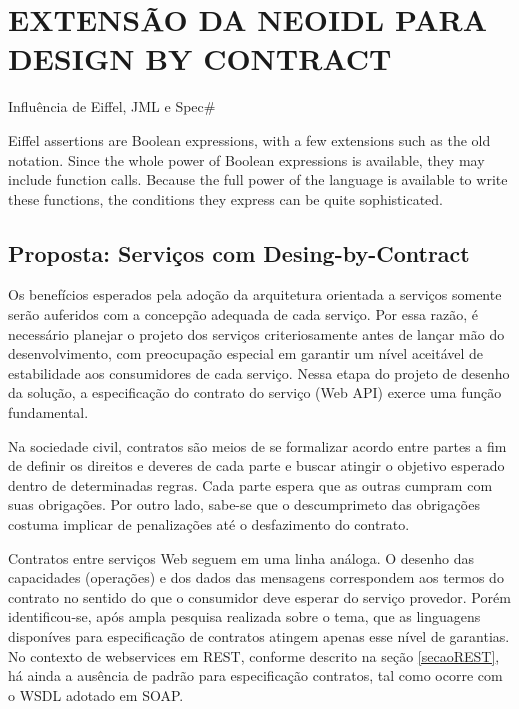 
\section{EXTENSÃO DA NEOIDL PARA DESIGN BY CONTRACT}

Influência de Eiffel, JML e Spec\#

Eiffel assertions are Boolean expressions, with a few extensions such as the old
notation. Since the whole power of Boolean expressions is available, they may
include function calls. Because the full power of the language is available to
write these functions, the conditions they express can be quite sophisticated.
\cite{meyer1992applying}

 
 
\subsection{Proposta: Serviços com Desing-by-Contract}
\vspace{-6mm}

Os benefícios esperados pela adoção da arquitetura orientada a serviços
somente serão auferidos com a concepção adequada de cada serviço. 
Por essa razão, é necessário planejar o projeto dos serviços criteriosamente
antes de lançar mão do desenvolvimento, com preocupação especial em garantir
um nível aceitável de estabilidade aos consumidores de cada serviço.
Nessa etapa do projeto de desenho da solução, a especificação do contrato do
serviço (Web API) exerce uma função fundamental. 

Na sociedade civil, contratos são meios de se formalizar acordo entre partes a
fim de definir os direitos e deveres de cada parte e buscar atingir o
objetivo esperado dentro de determinadas regras. Cada parte espera que as outras
cumpram com suas obrigações.
Por outro lado, sabe-se que o descumprimeto das obrigações costuma implicar de
penalizações até o desfazimento do contrato. 

Contratos entre serviços Web seguem em uma linha análoga. O desenho das
capacidades (operações) e dos dados das mensagens correspondem aos
termos do contrato no sentido do que o consumidor deve esperar do serviço
provedor. Porém identificou-se, após ampla pesquisa realizada sobre o tema, que
as linguagens disponíves para especificação de contratos atingem apenas esse
nível de garantias. No contexto de webservices em REST, conforme descrito na
seção \ref{secaoREST}, há ainda a ausência de padrão para especificação
contratos, tal como ocorre com o WSDL adotado em SOAP.

